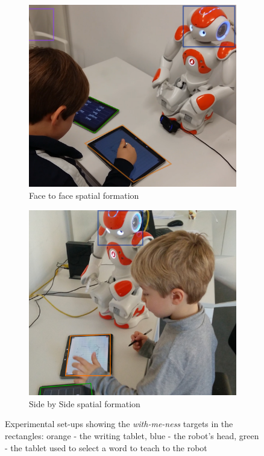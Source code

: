 \documentclass[letterpaper, 10 pt, conference]{ieeeconf}  %
\begin{document}
\begin{figure}
\centering
\begin{subfigure}{0.5\textwidth}
  \centering
  \includegraphics[width=0.7\linewidth]{./figures/f2f_photot.png}
  \caption{Face to face spatial formation}
  \label{fig:sub1}
\end{subfigure}%
\begin{subfigure}{0.5\textwidth}
  \centering
  \includegraphics[width=0.7\linewidth]{./figures/s2s_photo2t.jpg}
  \caption{Side by Side spatial formation}
  \label{fig:sub2}
\end{subfigure}
 \caption{Experimental set-ups showing the \emph{with-me-ness} targets in the rectangles: orange - the writing tablet,  blue - the robot's head, green - the tablet used to select a word to teach to the robot}
\label{fig:test}
\end{figure}
\end{document}
